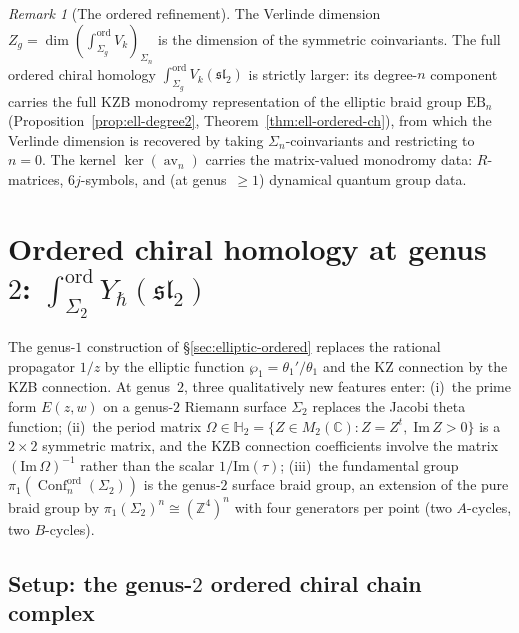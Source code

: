 \documentclass[11pt,reqno]{amsart}
\theoremstyle{definition}
\theoremstyle{remark}
\newtheorem{remark}[theorem]{Remark}
\DeclareMathOperator{\Conf}{Conf}
\DeclareMathOperator{\av}{av}
\newcommand{\CC}{\mathbb{C}}
\newcommand{\ZZ}{\mathbb{Z}}
\newcommand{\HHH}{\mathbb{H}}
\numberwithin{equation}{section}
\begin{document}
\begin{remark}[The ordered refinement]
\label{rem:verlinde-ordered-refinement}
The Verlinde dimension $Z_g = \dim(\int_{\Sigma_g}^{\mathrm{ord}}
V_k)_{\Sigma_n}$ is the dimension of the symmetric coinvariants.
The full ordered chiral homology
$\int_{\Sigma_g}^{\mathrm{ord}} V_k(\mathfrak{sl}_2)$
is strictly larger: its degree-$n$ component carries the
full KZB monodromy representation of the elliptic braid
group $\mathrm{EB}_n$
(Proposition~\ref{prop:ell-degree2},
Theorem~\ref{thm:ell-ordered-ch}), from which the Verlinde
dimension is recovered by taking $\Sigma_n$-coinvariants
and restricting to $n = 0$. The kernel $\ker(\av_n)$
carries the matrix-valued monodromy data: $R$-matrices,
$6j$-symbols, and (at genus~$\geq 1$) dynamical quantum
group data.
\end{remark}



\section{Ordered chiral homology at genus~$2$:
$\int_{\Sigma_2}^{\mathrm{ord}} Y_\hbar(\mathfrak{sl}_2)$}
\label{sec:genus2-ordered}

The genus-$1$ construction of \S\ref{sec:elliptic-ordered}
replaces the rational propagator $1/z$ by the elliptic
function $\wp_1 = \theta_1'/\theta_1$ and the KZ connection
by the KZB connection. At genus~$2$, three qualitatively
new features enter: (i)~the prime form $E(z,w)$ on a
genus-$2$ Riemann surface $\Sigma_2$ replaces the Jacobi
theta function; (ii)~the period matrix
$\Omega \in \HHH_2 = \{Z \in M_2(\CC) : Z = Z^t,\;
\mathrm{Im}\,Z > 0\}$ is a $2 \times 2$ symmetric matrix,
and the KZB connection coefficients involve the matrix
$(\mathrm{Im}\,\Omega)^{-1}$ rather than the scalar
$1/\mathrm{Im}(\tau)$; (iii)~the fundamental group
$\pi_1(\Conf_n^{\mathrm{ord}}(\Sigma_2))$ is the genus-$2$
surface braid group, an extension of the pure braid group
by $\pi_1(\Sigma_2)^n \cong (\ZZ^4)^n$ with four generators
per point (two $A$-cycles, two $B$-cycles).

\subsection{Setup: the genus-$2$ ordered chiral chain
complex}
\label{subsec:genus2-setup}
\end{document}

